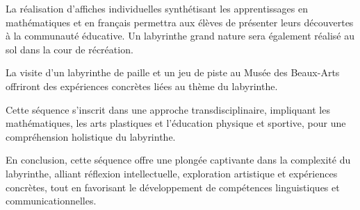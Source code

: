 La réalisation d'affiches individuelles synthétisant les apprentissages en mathématiques et en français permettra aux élèves de présenter leurs découvertes à la communauté éducative. Un labyrinthe grand nature sera également réalisé au sol dans la cour de récréation.

La visite d'un labyrinthe de paille et un jeu de piste au Musée des Beaux-Arts offriront des expériences concrètes liées au thème du labyrinthe.

Cette séquence s'inscrit dans une approche transdisciplinaire, impliquant les mathématiques, les arts plastiques et l'éducation physique et sportive, pour une compréhension holistique du labyrinthe.

En conclusion, cette séquence offre une plongée captivante dans la complexité du labyrinthe, alliant réflexion intellectuelle, exploration artistique et expériences concrètes, tout en favorisant le développement de compétences linguistiques et communicationnelles.
